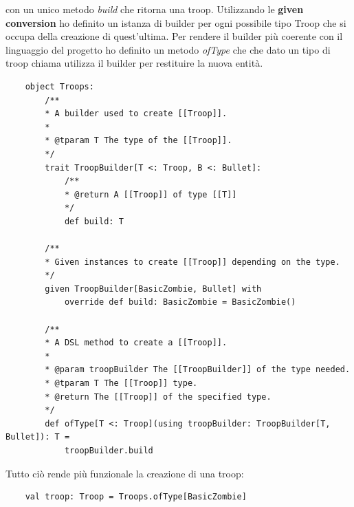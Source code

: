 con un unico metodo \textit{build} che ritorna una troop.
Utilizzando le \textbf{given conversion} ho definito un istanza di builder per ogni possibile tipo Troop che si occupa
della creazione di quest'ultima.
Per rendere il builder più coerente con il linguaggio del progetto ho definito un metodo \textit{ofType} che che dato un tipo
di troop chiama utilizza il builder per restituire la nuova entità.
\begin{verbatim}
    object Troops:
        /**
        * A builder used to create [[Troop]].
        *
        * @tparam T The type of the [[Troop]].
        */
        trait TroopBuilder[T <: Troop, B <: Bullet]:
            /**
            * @return A [[Troop]] of type [[T]]
            */
            def build: T

        /**
        * Given instances to create [[Troop]] depending on the type.
        */
        given TroopBuilder[BasicZombie, Bullet] with
            override def build: BasicZombie = BasicZombie()

        /**
        * A DSL method to create a [[Troop]].
        *
        * @param troopBuilder The [[TroopBuilder]] of the type needed.
        * @tparam T The [[Troop]] type.
        * @return The [[Troop]] of the specified type.
        */
        def ofType[T <: Troop](using troopBuilder: TroopBuilder[T, Bullet]): T =
            troopBuilder.build
\end{verbatim}

Tutto ciò rende più funzionale la creazione di una troop:
\begin{verbatim}
    val troop: Troop = Troops.ofType[BasicZombie]
\end{verbatim}

